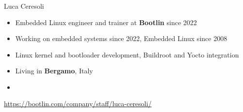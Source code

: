 \begin{frame}{Luca Ceresoli}
    \begin{itemize}
	\item Embedded Linux engineer and trainer at {\bf Bootlin}
          since 2022
        \item Working on embedded systems since 2022, Embedded Linux
          since 2008
        \item Linux kernel and bootloader development, Buildroot and
          Yocto integration
	\item Living in {\bf Bergamo}, Italy
	\item {}
    \end{itemize}
    {\small \url{https://bootlin.com/company/staff/luca-ceresoli/}}
\end{frame}
